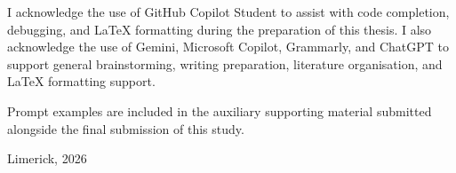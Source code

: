 


\begin{aideclaration}    %

I acknowledge the use of GitHub Copilot Student to assist with code completion, debugging, and LaTeX formatting during the preparation of this thesis. I also acknowledge the use of Gemini, Microsoft Copilot, Grammarly, and ChatGPT to support general brainstorming, writing preparation, literature organisation, and LaTeX formatting support.

Prompt examples are included in the auxiliary supporting material submitted alongside the final submission of this study.

\vspace{10mm}

Limerick, 2026


\end{aideclaration}



